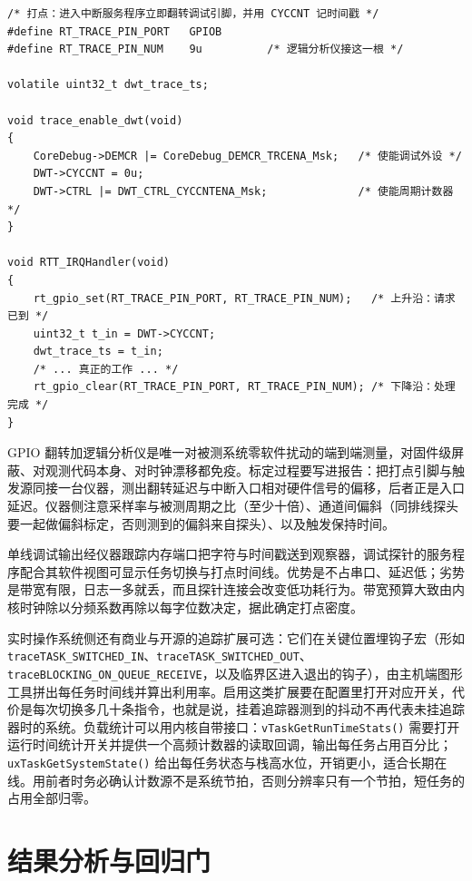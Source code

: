 \documentclass[12pt,a4paper,fontset=fandol]{ctexbook}
\newcommand{\Fn}[1]{\texttt{#1()}}
\newcommand{\Tp}[1]{\texttt{#1}}
\begin{document}
\begin{lstlisting}[style=cstyle,caption={C：DWT 周期计数器与 GPIO 翻转的组合打点},label={lst:ch11-cyccnt-gpio}]
/* 打点：进入中断服务程序立即翻转调试引脚，并用 CYCCNT 记时间戳 */
#define RT_TRACE_PIN_PORT   GPIOB
#define RT_TRACE_PIN_NUM    9u          /* 逻辑分析仪接这一根 */

volatile uint32_t dwt_trace_ts;

void trace_enable_dwt(void)
{
    CoreDebug->DEMCR |= CoreDebug_DEMCR_TRCENA_Msk;   /* 使能调试外设 */
    DWT->CYCCNT = 0u;
    DWT->CTRL |= DWT_CTRL_CYCCNTENA_Msk;              /* 使能周期计数器 */
}

void RTT_IRQHandler(void)
{
    rt_gpio_set(RT_TRACE_PIN_PORT, RT_TRACE_PIN_NUM);   /* 上升沿：请求已到 */
    uint32_t t_in = DWT->CYCCNT;
    dwt_trace_ts = t_in;
    /* ... 真正的工作 ... */
    rt_gpio_clear(RT_TRACE_PIN_PORT, RT_TRACE_PIN_NUM); /* 下降沿：处理完成 */
}
\end{lstlisting}

GPIO 翻转加逻辑分析仪是唯一对被测系统零软件扰动的端到端测量，对固件级屏蔽、对观测代码本身、对时钟漂移都免疫。标定过程要写进报告：把打点引脚与触发源同接一台仪器，测出翻转延迟与中断入口相对硬件信号的偏移，后者正是入口延迟。仪器侧注意采样率与被测周期之比（至少十倍）、通道间偏斜（同排线探头要一起做偏斜标定，否则测到的偏斜来自探头）、以及触发保持时间。

单线调试输出经仪器跟踪内存端口把字符与时间戳送到观察器，调试探针的服务程序配合其软件视图可显示任务切换与打点时间线。优势是不占串口、延迟低；劣势是带宽有限，日志一多就丢，而且探针连接会改变低功耗行为。带宽预算大致由内核时钟除以分频系数再除以每字位数决定，据此确定打点密度。

实时操作系统侧还有商业与开源的追踪扩展可选：它们在关键位置埋钩子宏（形如 \Tp{traceTASK\_SWITCHED\_IN}、\Tp{traceTASK\_SWITCHED\_OUT}、\Tp{traceBLOCKING\_ON\_QUEUE\_RECEIVE}，以及临界区进入退出的钩子），由主机端图形工具拼出每任务时间线并算出利用率。启用这类扩展要在配置里打开对应开关，代价是每次切换多几十条指令，也就是说，挂着追踪器测到的抖动不再代表未挂追踪器时的系统。负载统计可以用内核自带接口：\Fn{vTaskGetRunTimeStats} 需要打开运行时间统计开关并提供一个高频计数器的读取回调，输出每任务占用百分比；\Fn{uxTaskGetSystemState} 给出每任务状态与栈高水位，开销更小，适合长期在线。用前者时务必确认计数源不是系统节拍，否则分辨率只有一个节拍，短任务的占用全部归零。

\section{结果分析与回归门}
\end{document}
